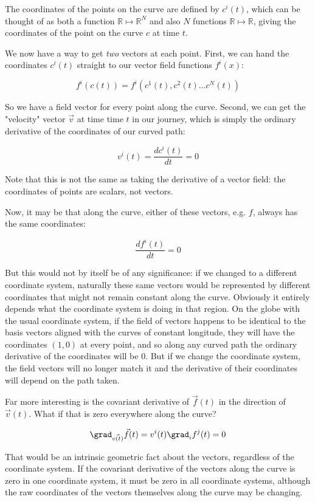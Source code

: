 The coordinates of the points on the curve are defined by $c^i(t)$, which can be thought of as both a function $\mathbb{R} \mapsto \mathbb{R}^N$ and also $N$ functions $\mathbb{R} \mapsto \mathbb{R}$, giving the coordinates of the point on the curve $c$ at time $t$.

We now have a way to get \textit{two} vectors at each point. First, we can hand the coordinates $c^i(t)$ straight to our vector field functions $f^i(x)$:

$$
f^i(c(t)) = f^i(c^1(t), c^2(t) \dots c^N(t))
$$

So we have a field vector for every point along the curve. Second, we can get the "velocity" vector $\vec{v}$ at time time $t$ in our journey, which is simply the ordinary derivative of the coordinates of our curved path:

$$
v^i(t) = \frac{d c^i(t)}{dt} = 0
$$

Note that this is not the same as taking the derivative of a vector field: the coordinates of points are scalars, not vectors.

Now, it may be that along the curve, either of these vectors, e.g. $f$, always has the same coordinates:

$$
\frac{d f^i(t)}{dt} = 0
$$

But this would not by itself be of any significance: if we changed to a different coordinate system, naturally these same vectors would be represented by different coordinates that might not remain constant along the curve. Obviously it entirely depends what the coordinate system is doing in that region. On the globe with the usual coordinate system, if the field of vectors happens to be identical to the basis vectors aligned with the curves of constant longitude, they will have the coordinates $(1, 0)$ at every point, and so along any curved path the ordinary derivative of the coordinates will be $0$. But if we change the coordinate system, the field vectors will no longer match it and the derivative of their coordinates will depend on the path taken.

Far more interesting is the covariant derivative of $\vec{f}(t)$ in the direction of $\vec{v}(t)$. What if that is zero everywhere along the curve?

$$
\grad_{\vec{v(t)}} \vec{f}(t)
=
v^i(t) \grad_i f^j(t) = 0
$$

That would be an intrinsic geometric fact about the vectors, regardless of the coordinate system. If the covariant derivative of the vectors along the curve is zero in one coordinate system, it must be zero in all coordinate systems, although the raw coordinates of the vectors themselves along the curve may be changing.

